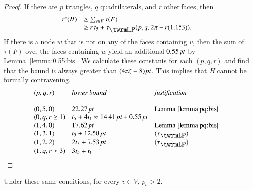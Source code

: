 \begin{proof}
If there are $p$ triangles, $q$ quadrilaterals, and $r$ other
faces, then
    $$
    \begin{array}{lll}
    \tau^*(H) &\ge\sum_{v\in F}\tau(F)\\
        &\ge r\, t_5 + \tauLP(p,q,2\pi-r(1.153)).
    \end{array}
    $$ If there is a node $w$ that is
not on any of the faces containing $v$, then the sum of $\tau(F)$
over the faces containing $w$ yield an additional $0.55\,\hbox{\it pt}$ by
Lemma~\ref{lemma:0.55:bis}. We calculate these constants for each
$(p,q,r)$ and find that the bound is always greater than
$(4\pi\zeta-8)\,\hbox{\it pt}$. This implies that $H$ cannot be formally contravening.
$$\begin{array}{llll}
    (p,q,r)&\hbox{\it lower bound }&\hbox{\it justification}\\
    &\\
    (0,5,0)&22.27\,\pt&\text{Lemma~\ref{lemma:pq:bis}}\\
    (0,q,r\ge1)& t_5+4 t_4\approx 14.41\,\pt +0.55\,\pt& \\
    (1,4,0) &17.62\,\pt &\text{Lemma~\ref{lemma:pq:bis}}\\
    (1,3,1) &t_5 + 12.58\,\pt &(\tauLP)\\
    (1,2,2) &2t_5 + 7.53\,\pt &(\tauLP)\\
    (1,q,r\ge3)& 3 t_5 + t_4& \\
\end{array}
$$
\end{proof}


\begin{lemma} Under these same conditions, for every $v\in V$,
$p_v>2$.
\end{lemma}

